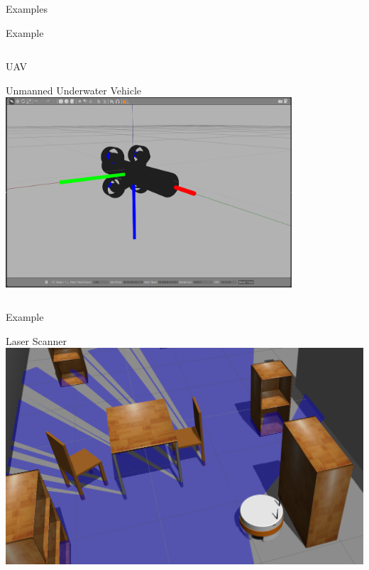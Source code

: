 \documentclass[9pt]{beamer}
\begin{document}
\begin{section}{Examples}
\begin{frame}{Example}
\begin{columns}
\begin{column}{0.5\textwidth}
\begin{block}{UAV}
            \end{block}
            \begin{block}{Unmanned Underwater Vehicle}            
                \includegraphics[width=0.8\textwidth,trim={0cm 0cm 0cm 0cm},clip]{hippocampus.png}
            \end{block}
        \end{column}        
    \end{columns}
    \end{frame}
    
    \begin{frame}{Example}
        \begin{block}{Laser Scanner}
            \includegraphics[width=\textwidth,trim={0cm 0cm 0cm 0cm},clip]{laserscanner.png}
        \end{block}
    \end{frame}


\end{section}
\end{document}
